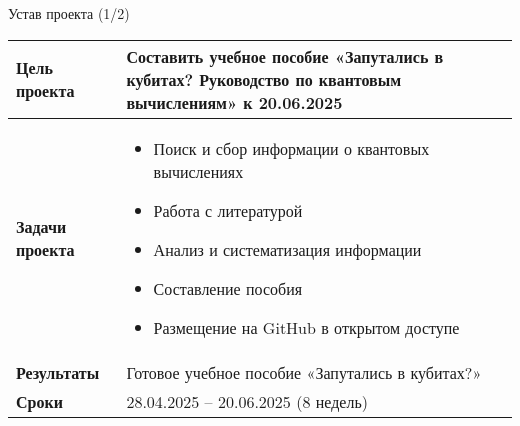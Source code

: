 \documentclass{beamer}
\begin{document}
 \begin{frame}{Устав проекта (1/2)}
 	\footnotesize
 	\setlength{\tabcolsep}{4pt}
 	\renewcommand{\arraystretch}{1.2}
 	
 	\begin{longtable}{|p{3cm}|p{8cm}|}
 		\hline
 		\textbf{Цель проекта} & 
 		Составить учебное пособие «Запутались в кубитах? Руководство по квантовым вычислениям» к 20.06.2025 \\ \hline
 		
 		\textbf{Задачи проекта} & 
 		\begin{itemize}
 			\item Поиск и сбор информации о квантовых вычислениях
 			\item Работа с литературой
 			\item Анализ и систематизация информации
 			\item Составление пособия
 			\item Размещение на GitHub в открытом доступе
 		\end{itemize} \\ \hline
 		
 		\textbf{Результаты} & 
 		Готовое учебное пособие «Запутались в кубитах?» \\ \hline
 		
 		\textbf{Сроки} & 
 		28.04.2025 – 20.06.2025 (8 недель) \\ \hline
 	\end{longtable}
 \end{frame}
 
\end{document}
